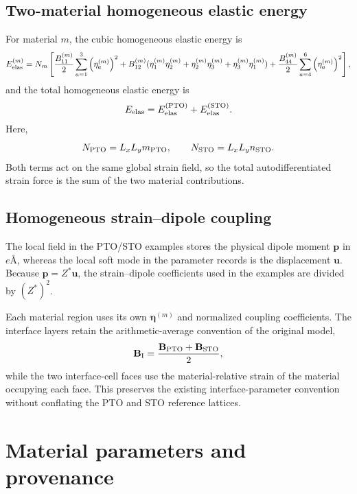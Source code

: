 \documentclass[11pt,a4paper]{article}
\begin{document}
\subsection{Two-material homogeneous elastic energy}
For material $m$, the cubic homogeneous elastic energy is
\begin{equation}
 E_{\rm elas}^{(m)}=N_m\left[
 \frac{B_{11}^{(m)}}{2}\sum_{a=1}^{3}\left(\eta_a^{(m)}\right)^2
 +B_{12}^{(m)}(\eta_1^{(m)}\eta_2^{(m)}+\eta_2^{(m)}\eta_3^{(m)}+\eta_3^{(m)}\eta_1^{(m)})
 +\frac{B_{44}^{(m)}}{2}\sum_{a=4}^{6}\left(\eta_a^{(m)}\right)^2
 \right],
\end{equation}
and the total homogeneous elastic energy is
\begin{equation}
  E_{\rm elas}=E_{\rm elas}^{(\rm PTO)}+E_{\rm elas}^{(\rm STO)}.
\end{equation}
Here,
\begin{equation}
  N_{\rm PTO}=L_xL_y m_{\rm PTO},\qquad
  N_{\rm STO}=L_xL_y n_{\rm STO}.
\end{equation}
Both terms act on the same global strain field, so the total autodifferentiated strain force is the sum of the two material contributions.

\subsection{Homogeneous strain--dipole coupling}
The local field in the PTO/STO examples stores the physical dipole moment $\mathbf p$ in $e$\AA, whereas the local soft mode in the parameter records is the displacement $\mathbf u$. Because $\mathbf p=Z^*\mathbf u$, the strain--dipole coefficients used in the examples are divided by $(Z^*)^2$.

Each material region uses its own $\bm\eta^{(m)}$ and normalized coupling coefficients. The interface layers retain the arithmetic-average convention of the original model,
\begin{equation}
 \mathbf B_{\rm I}=\frac{\mathbf B_{\rm PTO}+\mathbf B_{\rm STO}}{2},
\end{equation}
while the two interface-cell faces use the material-relative strain of the material occupying each face. This preserves the existing interface-parameter convention without conflating the PTO and STO reference lattices.

\section{Material parameters and provenance}
\end{document}
